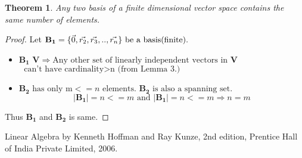\documentclass[11pt]{article}
\theoremstyle{definition}
\theoremstyle{plain}
\newtheorem{theorem}{Theorem}
\begin{document}
\begin{theorem}
Any two basis of a finite dimensional vector space contains the same number of elements.
\end{theorem}

\begin{proof}
Let $\mathbf{B_1} = \{ \vec{0} , \vec{r_2} , \vec{r_3} , .. , \vec{r_n}\}\text{ be a basis(finite)\newline}. $


\begin{itemize}
    \item {} $\mathbf{B_1}$  $\mathbf{V} \Rightarrow \text{Any other set of linearly independent vectors in } $\textbf{V}$ \text{ can't have cardinality}>\text{n (from Lemma 3.)} $ 
    \item {} $\mathbf{B_2} \text{ has only m}<=n\text{ elements. }$$\mathbf{B_2} \text{ is also a spanning set.}$
    $$|\mathbf{B_1}|=n<=m \text{ and } |\mathbf{B_1}|=n<=m \Rightarrow n=m$$
    
\end{itemize}
Thus  $\mathbf{B_1}$ and $\mathbf{B_2}$ is same.
\end{proof}
\pagebreak

\begin{thebibliography}{1}
Linear Algebra  by  Kenneth Hoffman and Ray Kunze, 2nd edition, Prentice Hall of India Private Limited, 2006.

\end{thebibliography}
\end{document}
